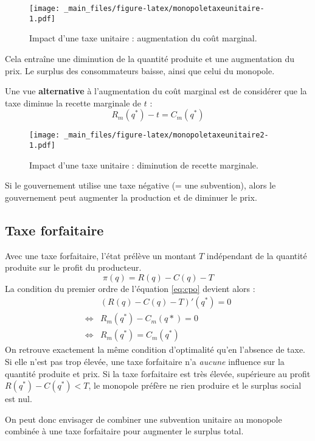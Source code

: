 \documentclass[
]{book}
\theoremstyle{definition}
\theoremstyle{definition}
\theoremstyle{definition}
\theoremstyle{definition}
\theoremstyle{remark}
\begin{document}
\begin{figure}
\centering
\texttt{[image: \_main\_files/figure-latex/monopoletaxeunitaire-1.pdf]}
\caption{\label{fig:monopoletaxeunitaire}Impact d'une taxe unitaire : augmentation du coût marginal.}
\end{figure}

Cela entraîne une diminution de la quantité produite et une augmentation du prix.
Le surplus des consommateurs baisse, ainsi que celui du monopole.

Une vue \textbf{alternative} à l'augmentation du coût marginal est de considérer que la taxe diminue la recette marginale de \(t\) :
\[
 R_m(q^*) -t = C_m(q^*)
\]

\begin{figure}
\centering
\texttt{[image: \_main\_files/figure-latex/monopoletaxeunitaire2-1.pdf]}
\caption{\label{fig:monopoletaxeunitaire2}Impact d'une taxe unitaire : diminution de recette marginale.}
\end{figure}

Si le gouvernement utilise une taxe négative (= une subvention), alors le gouvernement peut augmenter la production et de diminuer le prix.

\hypertarget{taxe-forfaitaire}{%
\subsection{Taxe forfaitaire}\label{taxe-forfaitaire}}

Avec une taxe forfaitaire, l'état prélève un montant \(T\) indépendant de la quantité produite sur le profit du producteur.
\[
\pi(q) = R(q) - C(q) -T
\]
La condition du premier ordre de l'équation \eqref{eq:cpo} devient alors :
\[
\begin{array}{rl}
& (R(q)-C(q) -T)'(q^*) = 0\\
\Leftrightarrow & R_m(q^*)-C_m(q*) = 0\\
\Leftrightarrow & R_m(q^*) = C_m(q^*)
\end{array}
\]
On retrouve exactement la même condition d'optimalité qu'en l'absence de taxe.
Si elle n'est pas trop élevée, une taxe forfaitaire n'a \emph{aucune} influence sur la quantité produite et prix.
Si la taxe forfaitaire est très élevée, supérieure au profit \(R(q^*) - C(q^*) <T\), le monopole préfère ne rien produire et le surplus social est nul.

On peut donc envisager de combiner une subvention unitaire au monopole combinée à une taxe forfaitaire pour augmenter le surplus total.
\end{document}
